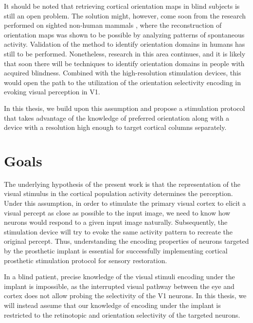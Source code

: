 It should be noted that retrieving cortical orientation maps in blind subjects is still an open problem. The solution might, however, come soon from the research performed on sighted non-human mammals \citep{smith2018distributed}, where the reconstruction of orientation maps was shown to be possible by analyzing patterns of spontaneous activity. Validation of the method to identify orientation domains in humans has still to be performed. Nonetheless, research in this area continues, and it is likely that soon there will be techniques to identify orientation domains in people with acquired blindness. Combined with the high-resolution stimulation devices, this would open the path to the utilization of the orientation selectivity encoding in evoking visual perception in V1. 

In this thesis, we build upon this assumption and propose a stimulation protocol that takes advantage of the knowledge of preferred orientation along with a device with a resolution high enough to target cortical columns separately.


\section*{Goals}

The underlying hypothesis of the present work is that the representation of the visual stimulus in the cortical population activity determines the perception. Under this assumption, in order to stimulate the primary visual cortex to elicit a visual percept as close as possible to the input image, we need to know how neurons would respond to a given input image naturally. Subsequently, the stimulation device will try to evoke the same activity pattern to recreate the original percept. Thus, understanding the encoding properties of neurons targeted by the prosthetic implant is essential for successfully implementing cortical prosthetic stimulation protocol for sensory restoration.

In a blind patient, precise knowledge of the visual stimuli encoding under the implant is impossible, as the interrupted visual pathway between the eye and cortex does not allow probing the selectivity of the V1 neurons. In this thesis, we will instead assume that our knowledge of encoding under the implant is restricted to the retinotopic and orientation selectivity of the targeted neurons.

